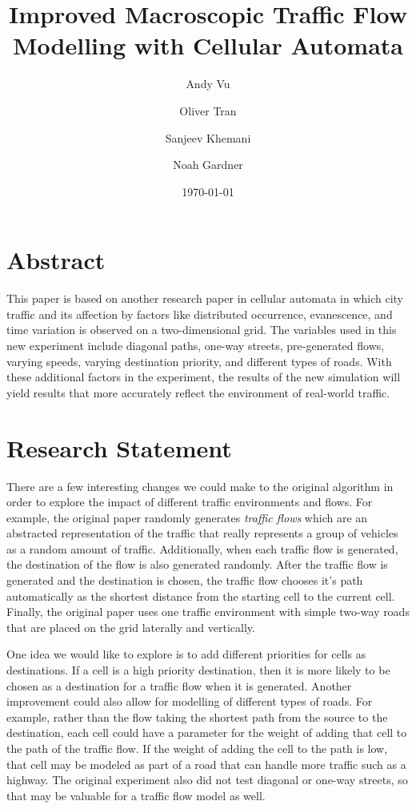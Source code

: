 \documentclass[12pt]{article}
\title{Improved Macroscopic Traffic Flow Modelling with Cellular Automata}
\author[1]{Andy Vu}
\author[1]{Oliver Tran}
\author[1]{Sanjeev Khemani}
\author[1]{Noah Gardner}
\affil[1]{College of Computing and Software Engineering, Kennesaw State University}
\date{\today}
\begin{document}
\maketitle
\section{Abstract}
This paper is based on another research paper in cellular automata in which city
traffic and its affection by factors like distributed occurrence, evanescence,
and time variation is observed on a two-dimensional grid. The variables used in
this new experiment include diagonal paths, one-way streets, pre-generated
flows, varying speeds, varying destination priority, and different types of
roads. With these additional factors in the experiment, the results of the new
simulation will yield results that more accurately reflect the environment of
real-world traffic.

\section{Research Statement}
There are a few interesting changes we could make to the original algorithm in
order to explore the impact of different traffic environments and flows. For
example, the original paper randomly generates \textit{traffic flows} which are
an abstracted representation of the traffic that really represents a group of
vehicles as a random amount of traffic. Additionally, when each traffic flow is
generated, the destination of the flow is also generated randomly. After the
traffic flow is generated and the destination is chosen, the traffic flow
chooses it's path automatically as the shortest distance from the starting cell
to the current cell. Finally, the original paper uses one traffic environment
with simple two-way roads that are placed on the grid laterally and vertically.

One idea we would like to explore is to add different priorities for cells as
destinations. If a cell is a high priority destination, then it is more likely
to be chosen as a destination for a traffic flow when it is generated. Another
improvement could also allow for modelling of different types of roads. For
example, rather than the flow taking the shortest path from the source to the
destination, each cell could have a parameter for the weight of adding that cell
to the path of the traffic flow. If the weight of adding the cell to the path is
low, that cell may be modeled as part of a road that can handle more traffic
such as a highway. The original experiment also did not test diagonal or one-way
streets, so that may be valuable for a traffic flow model as well.
\end{document}

